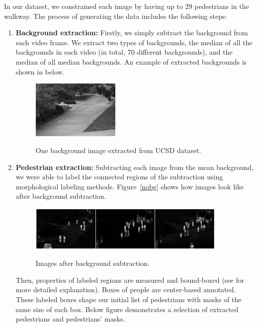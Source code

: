 In our dataset, we constrained each image by having up to 29 pedestrians in the walkway. The process of generating the data includes the following steps:
\begin{enumerate}

\item \textbf{Background extraction:} Firstly, we simply subtract the background from each video frame. We extract two types of backgrounds, the median of all the backgrounds in each video (in total, 70 different backgrounds), and the median of all median backgrounds. An example of extracted backgrounds is shown in below.

\begin{figure}[H]
	\centering
	{\includegraphics[width=0.4\textwidth]{images/background}}
	\caption{One background image extracted from UCSD dataset.}
	\label{fig:bgim}
\end{figure}


\item \textbf{Pedestrian extraction:} Subtracting each image from the mean background, we were able to label the connected regions of the subtraction using morphological labeling methods. Figure~\ref{nobg} shows how images look like after background subtraction. 
\begin{figure}[H]
	\centering
	{\includegraphics[width=0.9\textwidth]{images/nobg}}
	\caption{Images after background subtraction.}
	\label{fig:nobg}
\end{figure}
 
Then, properties of labeled regions are measured and bound-boxed (see \cite{van2014scikit} for more detailed explanation). Boxes of people are center-based annotated. These labeled boxes shape our initial list of pedestrians with masks of the same size of each box. Below figure demonstrates a selection of extracted pedestrians and pedestrians' masks.


\end{enumerate}
